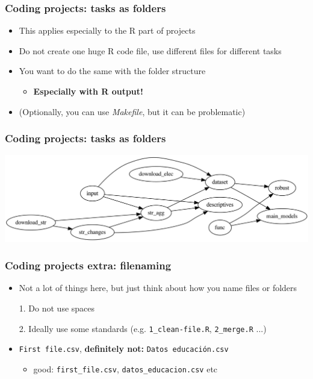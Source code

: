 \documentclass[aspectratio=43]{beamer}
\begin{document}
\begin{frame}
\frametitle{Coding projects: tasks as folders}
\centering

\begin{itemize}
  \item This applies especially to the R part of projects
  \item Do not create one huge R code file, use different files for different tasks
  \item You want to do the same with the folder structure
  \begin{itemize}
    \item \textbf{Especially with R output!}
  \end{itemize}
  \item (Optionally, you can use \textit{Makefile}, but it can be problematic)
\end{itemize}

\end{frame}

\begin{frame}
\frametitle{Coding projects: tasks as folders}
\centering

\includegraphics[width = \textwidth]{img/workflow_vox_streets}

\end{frame}

\begin{frame}
\frametitle{Coding projects extra: filenaming}
\centering

\begin{itemize}
  \item Not a lot of things here, but just think about how you name files or folders
  \item[1.] Do not use spaces
  \item[2.] Ideally use some standards (e.g. \texttt{1_clean-file.R}, \texttt{2_merge.R} ...)
  \item \textbf{{\color{red}{DON'T:}}} \texttt{First file.csv}, \textbf{definitely not:} \texttt{Datos educación.csv}
  \begin{itemize}
    \item good: \texttt{first_file.csv}, \texttt{datos_educacion.csv} etc
  \end{itemize}
\end{itemize}

\end{frame}
\end{document}
